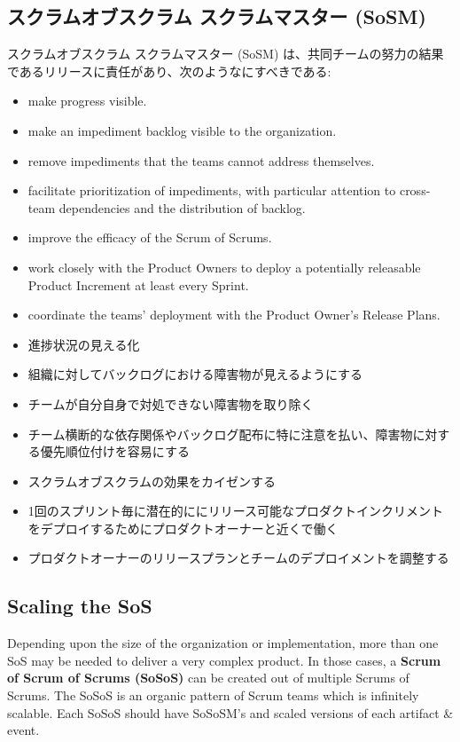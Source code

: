 \documentclass[12pt,a4paper,parskip=full]{scrartcl}
\begin{document}
\subsection{スクラムオブスクラム スクラムマスター (SoSM)}
スクラムオブスクラム スクラムマスター (SoSM) は、共同チームの努力の結果であるリリースに責任があり、次のようなにすべきである:
\begin{itemize}
\item make progress visible.
\item make an impediment backlog visible to the organization.
\item remove impediments that the teams cannot address themselves.
\item facilitate prioritization of impediments, with particular attention to cross-team
dependencies and the distribution of backlog.
\item improve the efficacy of the Scrum of Scrums.
\item work closely with the Product Owners to deploy a potentially
releasable Product Increment at least every Sprint.
\item coordinate the teams' deployment with the Product Owner's Release
Plans.
\end{itemize}
\fi
\begin{itemize}
\item 進捗状況の見える化
\item 組織に対してバックログにおける障害物が見えるようにする
\item チームが自分自身で対処できない障害物を取り除く
\item チーム横断的な依存関係やバックログ配布に特に注意を払い、障害物に対する優先順位付けを容易にする
\item スクラムオブスクラムの効果をカイゼンする
\item 1回のスプリント毎に潜在的ににリリース可能なプロダクトインクリメントをデプロイするためにプロダクトオーナーと近くで働く
\item プロダクトオーナーのリリースプランとチームのデプロイメントを調整する
\end{itemize}

\subsection{Scaling the SoS}
Depending upon the size of the organization or implementation, more than
one SoS may be needed to deliver a very complex product. In those cases, a
\textbf{Scrum of Scrum of Scrums (SoSoS)} can be created out of multiple
Scrums of Scrums. The SoSoS is an organic pattern of Scrum teams which is
infinitely scalable. Each SoSoS should have SoSoSM's and scaled versions of
each artifact \& event.
\end{document}
